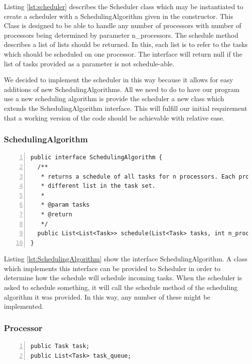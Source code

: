 \documentclass{article} %
\begin{document}
Listing \ref{lst:scheduler} describes the Scheduler class which may be instantiated to create a scheduler with a SchedulingAlgorithm given in the constructor.
This Class is designed to be able to handle any number of processors with number of processors being determined by parameter n\_processors.
The schedule method describes a list of lists should be returned.
In this, each list is to refer to the tasks which should be scheduled on one processor.
The interface will return null if the list of tasks provided as a parameter is not schedule-able.

We decided to implement the scheduler in this way because it allows for easy additions of new SchedulingAlgorithms.
All we need to do to have our program use a new scheduling algorithm is provide the scheduler a new class which extends the SchedulingAlgorithm interface.
This will fulfill our initial requirement that a working version of the code should be achievable with relative ease.

\subsubsection{SchedulingAlgorithm}
\begin{lstlisting}[caption={Scheduling Algorithm interface},label={lst:SchedulingAlgorithm},numbers=left]
public interface SchedulingAlgorithm {
  /**
   * returns a schedule of all tasks for n processors. Each processor has a
   * different list in the task set.
   * 
   * @param tasks
   * @return
   */
  public List<List<Task>> schedule(List<Task> tasks, int n_processors);
}
\end{lstlisting}

Listing \ref{lst:SchedulingAlgorithm} show the interface SchedulingAlgorithm.
A class which implements this interface can be provided to Scheduler in order to determine how the schedule will schedule incoming tasks.
When the scheduler is asked to schedule something, it will call the schedule method of the scheduling algorithm it was provided.
In this way, any number of these might be implemented.

\subsubsection{Processor}
\begin{lstlisting}[caption={},label={lst:processor},numbers=left]
public Task task;
public List<Task> task_queue;
\end{lstlisting}
\end{document}
